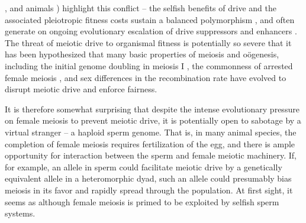 \documentclass[12pt,letterpaper]{article}
\begin{document}
\citep{Buckler1999,Fishman2005,Fishman2008}, and animals
\citep{Agulnik1990,Wu2005,Pardo-ManuelDeVillena2001c}) highlight this
conflict -- the selfish benefits of drive and the associated
pleiotropic fitness costs sustain a balanced polymorphism
\citep{Prout1973}, 
and often generate on ongoing evolutionary escalation of drive suppressors and enhancers \citep{Dawe1996,Fishman2008}. 
The threat of meiotic drive to organismal fitness is potentially so
severe that it has been hypothesized that many basic properties of meiosis and o\"{o}genesis, including the initial genome doubling in meiosis I \citep{Haig1991}, the commonness of arrested female meiosis \citep{Mira1998}, and sex differences in the recombination rate \citep{Haig2010,Brandvain2012} have evolved to disrupt meiotic drive and enforce fairness.

It is therefore somewhat surprising that despite the intense evolutionary pressure on female meiosis to prevent meiotic drive, 
it is potentially open to sabotage by a virtual stranger -- a haploid sperm genome.
That is, in many animal species, the completion of female meiosis requires fertilization of the egg, 
and there is ample opportunity for interaction between the sperm and female meiotic machinery.
If, for example, an allele in sperm could facilitate meiotic drive by a genetically equivalent allele in a 
heteromorphic dyad, such an allele could presumably bias meiosis in its favor and rapidly spread through the population.
At first sight, it seems as although female meiosis is primed to be exploited by selfish sperm systems.  

\end{document}
